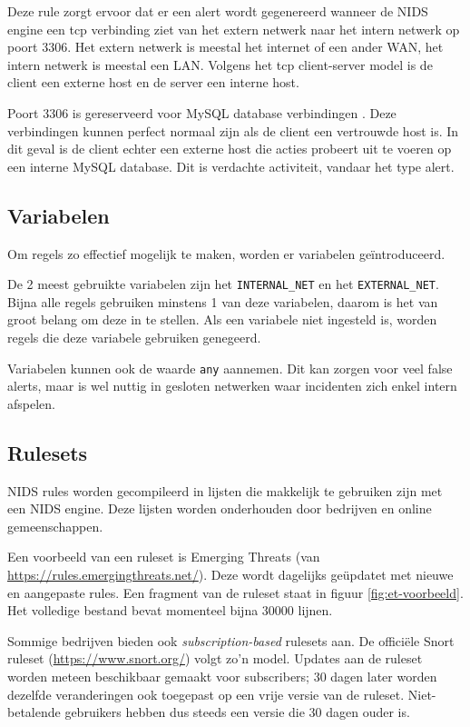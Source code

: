\documentclass[a4paper,12pt]{report}
\begin{document}
Deze rule zorgt ervoor dat er een alert wordt gegenereerd wanneer de NIDS engine een tcp verbinding ziet van het extern netwerk naar het intern netwerk op poort 3306.
Het extern netwerk is meestal het internet of een ander WAN, het intern netwerk is meestal een LAN.
Volgens het tcp client-server model is de client een externe host en de server een interne host.

Poort 3306 is gereserveerd voor MySQL database verbindingen \autocite{iana:ports}.
Deze verbindingen kunnen perfect normaal zijn als de client een vertrouwde host is.
In dit geval is de client echter een externe host die acties probeert uit te voeren op een interne MySQL database.
Dit is verdachte activiteit, vandaar het type alert.

\subsection{Variabelen}
Om regels zo effectief mogelijk te maken, worden er variabelen geïntroduceerd.

De 2 meest gebruikte variabelen zijn het \lstinline|INTERNAL_NET| en het \lstinline|EXTERNAL_NET|.
Bijna alle regels gebruiken minstens 1 van deze variabelen, daarom is het van groot belang om deze in te stellen.
Als een variabele niet ingesteld is, worden regels die deze variabele gebruiken genegeerd.

Variabelen kunnen ook de waarde \lstinline|any| aannemen.
Dit kan zorgen voor veel false alerts, maar is wel nuttig in gesloten netwerken waar incidenten zich enkel intern afspelen.

\subsection{Rulesets}
NIDS rules worden gecompileerd in lijsten die makkelijk te gebruiken zijn met een NIDS engine.
Deze lijsten worden onderhouden door bedrijven en online gemeenschappen.

Een voorbeeld van een ruleset is Emerging Threats (van \url{https://rules.emergingthreats.net/}).
Deze wordt dagelijks geüpdatet met nieuwe en aangepaste rules.
Een fragment van de ruleset staat in figuur \ref{fig:et-voorbeeld}.
Het volledige bestand bevat momenteel bijna $30000$ lijnen.

Sommige bedrijven bieden ook \emph{subscription-based} rulesets aan.
De officiële Snort ruleset (\url{https://www.snort.org/}) volgt zo'n model.
Updates aan de ruleset worden meteen beschikbaar gemaakt voor subscribers; 30 dagen later worden dezelfde veranderingen ook toegepast op een vrije versie van de ruleset.
Niet-betalende gebruikers hebben dus steeds een versie die 30 dagen ouder is.
\end{document}
